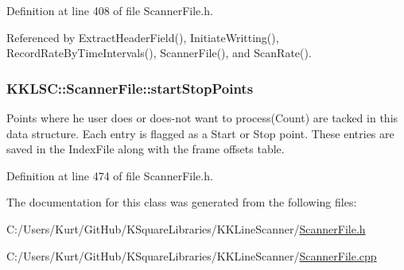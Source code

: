 Definition at line 408 of file Scanner\+File.\+h.



Referenced by Extract\+Header\+Field(), Initiate\+Writting(), Record\+Rate\+By\+Time\+Intervals(), Scanner\+File(), and Scan\+Rate().

\subsubsection[{\texorpdfstring{start\+Stop\+Points}{startStopPoints}}]{ K\+K\+L\+S\+C\+::\+Scanner\+File\+::start\+Stop\+Points\hspace{0.3cm}{\ttfamily [protected]}}\hypertarget{class_k_k_l_s_c_1_1_scanner_file_ad60cc653f141392719dd5e2f018c5797}{}\label{class_k_k_l_s_c_1_1_scanner_file_ad60cc653f141392719dd5e2f018c5797}
Points where he user does or does-\/not want to process(\+Count) are tacked in this data structure. Each entry is flagged as a Start or Stop point. These entries are saved in the Index\+File along with the frame offsets table. 

Definition at line 474 of file Scanner\+File.\+h.



The documentation for this class was generated from the following files\+:\begin{DoxyCompactItemize}
\item 
C\+:/\+Users/\+Kurt/\+Git\+Hub/\+K\+Square\+Libraries/\+K\+K\+Line\+Scanner/\hyperlink{_scanner_file_8h}{Scanner\+File.\+h}\item 
C\+:/\+Users/\+Kurt/\+Git\+Hub/\+K\+Square\+Libraries/\+K\+K\+Line\+Scanner/\hyperlink{_scanner_file_8cpp}{Scanner\+File.\+cpp}\end{DoxyCompactItemize}
